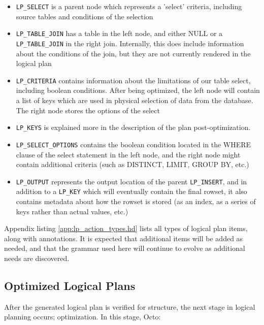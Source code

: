 \documentclass[]{article}
\def\code#1{\texttt{#1}}
\begin{document}
\begin{itemize}
	\item \code{LP\_SELECT} is a parent node which represents a 'select' criteria, including source tables and conditions of the selection
	\item \code{LP\_TABLE\_JOIN} has a table in the left node, and either NULL or a \code{LP\_TABLE\_JOIN} in the right join. Internally, this does include information about the conditions of the join, but they are not currently rendered in the logical plan
	\item \code{LP\_CRITERIA} contains information about the limitations of our table select, including boolean conditions. After being optimized, the left node will contain a list of keys which are used in physical selection of data from the database. The right node stores the options of the select
	\item \code{LP\_KEYS} is explained more in the description of the plan post-optimization.
	\item \code{LP\_SELECT\_OPTIONS} contains the boolean condition located in the WHERE clause of the select statement in the left node, and the right node might contain additional criteria (such as DISTINCT, LIMIT, GROUP BY, etc.)
	\item \code{LP\_OUTPUT} represents the output location of the parent \code{LP\_INSERT}, and in addition to a \code{LP\_KEY} which will eventually contain the final rowset, it also contains metadata about how the rowset is stored (as an index, as a series of keys rather than actual values, etc.)
\end{itemize}

Appendix listing \ref{app:lp_action_types.hd} lists all types of logical plan items, along with annotations.
It is expected that additional items will be added as needed, and that the grammar used here will continue to evolve as additional needs are discovered.

\subsection{Optimized Logical Plans} \label{sec:lp_optimization}

After the generated logical plan is verified for structure, the next stage in logical planning occurs; optimization.
In this stage, Octo:
\end{document}
